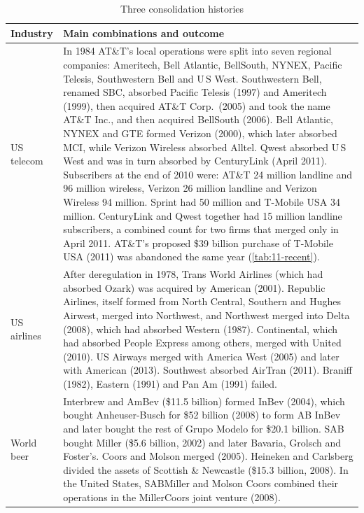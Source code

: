 \begin{table}[htbp]
\centering
\caption{Three consolidation histories}
\label{tab:11-consolidation}
\footnotesize
\begin{tabularx}{\textwidth}{@{}p{2.0cm}X@{}}
\toprule
Industry & Main combinations and outcome \\
\midrule
US telecom &
In 1984 AT\&T's local operations were split into seven regional companies: Ameritech, Bell Atlantic,
BellSouth, NYNEX, Pacific Telesis, Southwestern Bell and U\,S West. Southwestern Bell, renamed SBC, absorbed
Pacific Telesis (1997) and Ameritech (1999), then acquired AT\&T Corp.\ (2005) and took the name AT\&T Inc.,
and then acquired BellSouth (2006). Bell Atlantic, NYNEX and GTE formed Verizon (2000), which later absorbed MCI,
while Verizon Wireless absorbed Alltel. Qwest absorbed U\,S West and was in turn absorbed by CenturyLink
(April 2011). Subscribers at the end of 2010 were: AT\&T 24 million landline and 96 million wireless, Verizon 26
million landline and Verizon Wireless 94 million. Sprint had 50 million and T-Mobile USA 34 million. CenturyLink
and Qwest together had 15 million landline subscribers, a combined count for two firms that merged only in April
2011. AT\&T's proposed \$39 billion purchase of T-Mobile USA (2011) was abandoned the same year
(\cref{tab:11-recent}). \\[3pt]
US airlines &
After deregulation in 1978, Trans World Airlines (which had absorbed Ozark) was acquired by American (2001).
Republic Airlines, itself formed from North Central, Southern and Hughes Airwest, merged into Northwest, and
Northwest merged into Delta (2008), which had absorbed Western (1987). Continental, which had absorbed People
Express among others, merged with United (2010). US Airways merged with America West (2005) and later with
American (2013). Southwest absorbed AirTran (2011). Braniff (1982), Eastern (1991) and Pan Am (1991) failed. \\[3pt]
World beer &
Interbrew and AmBev (\$11.5 billion) formed InBev (2004), which bought Anheuser-Busch for \$52 billion (2008)
to form AB InBev and later bought the rest of Grupo Modelo for \$20.1 billion. SAB bought Miller (\$5.6 billion,
2002) and later Bavaria, Grolsch and Foster's. Coors and Molson merged (2005). Heineken and Carlsberg divided the
assets of Scottish \& Newcastle (\$15.3 billion, 2008). In the United States, SABMiller and Molson Coors combined
their operations in the MillerCoors joint venture (2008). \\
\bottomrule
\end{tabularx}


\end{table}
